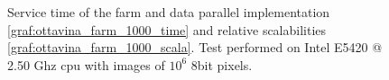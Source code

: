 \begin{figure}[p]
\centering
{}
\caption{ Service time of the farm and data parallel implementation \ref{graf:ottavina_farm_1000_time} and relative scalabilities \ref{graf:ottavina_farm_1000_scala}. Test performed on Intel E5420 @ 2.50 Ghz cpu with images of $10^6$ 8bit pixels.}
\label{chart:ottavina_data_1000}
\end{figure}


